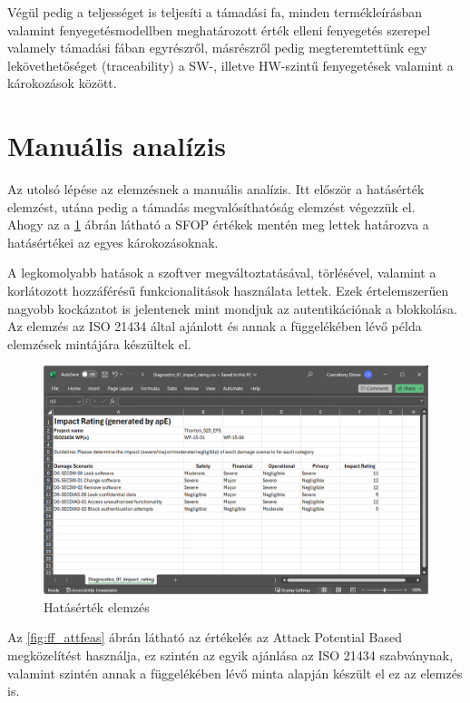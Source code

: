 Végül pedig a teljességet is teljesíti a támadási fa, minden termékleírásban valamint fenyegetésmodellben meghatározott érték elleni fenyegetés szerepel valamely támadási fában egyrészről, másrészről pedig megteremtettünk egy lekövethetőséget (traceability) a SW-, illetve HW-szintű fenyegetések valamint a károkozások között.

\section{Manuális analízis}

Az utolsó lépése az elemzésnek a manuális analízis. Itt először a hatásérték elemzést, utána pedig a támadás megvalósíthatóság elemzést végezzük el.\\

Ahogy az a \ref{fig:ff_imprate} ábrán látható a SFOP értékek mentén meg lettek határozva a hatásértékei az egyes károkozásoknak.

A legkomolyabb hatások a szoftver megváltoztatásával, törlésével, valamint a korlátozott hozzáférésű funkcionalitások használata lettek. Ezek értelemszerűen nagyobb kockázatot is jelentenek mint mondjuk az autentikációnak a blokkolása. Az elemzés az ISO 21434 \cite{ISO21434} által ajánlott és annak a függelékében lévő példa elemzések mintájára készültek el.\\

\begin{figure}[!ht]
	\centering
	\includegraphics[width=120mm, keepaspectratio]{figures/ff_imprate.png}
	\caption{Hatásérték elemzés} 
	\label{fig:ff_imprate}
\end{figure}

Az \ref{fig:ff_attfeas} ábrán látható az értékelés az Attack Potential Based megközelítést használja, ez szintén az egyik ajánlása az ISO 21434 \cite{ISO21434} szabványnak, valamint szintén annak a függelékében lévő minta alapján készült el ez az elemzés is.

